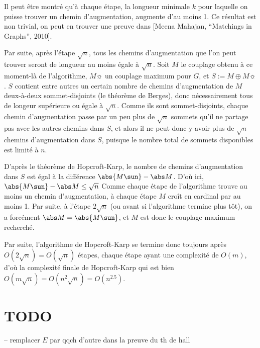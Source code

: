  Il peut être montré qu'à chaque étape, la longueur minimale $k$ pour laquelle on puisse trouver un chemin d'augmentation, augmente d'au moins 1. Ce résultat est non trivial, on peut en trouver une preuve dans [Meena Mahajan, ``Matchings in Graphs'', 2010].
 
 Par suite, après l'étape $\sqrt n$, tous les chemins d'augmentation que l'on peut trouver seront de longueur au moins égale à $\sqrt n$. Soit $M$ le couplage obtenu à ce moment-là de l'algorithme, $M\sun$ un couplage maximum pour $G$, et $S := M \oplus M\sun$. $S$ contient entre autres un certain nombre de chemins d'augmentation de $M$ deux-à-deux sommet-disjoints (\cf le théorème de Berges), donc nécessairement tous de longeur supérieure ou égale à $\sqrt n$. Comme ils sont sommet-disjoints, chaque chemin d'augmentation passe par un peu plus de $\sqrt n$ sommets qu'il ne partage pas avec les autres chemins dans $S$, et alors il ne peut donc y avoir plus de $\sqrt n$ chemins d'augmentation dans $S$, puisque le nombre total de sommets disponibles est limité à $n$.
 
 D'après le théorème de Hopcroft-Karp, le nombre de chemins d'augmentation dans $S$ est égal à la différence $\abs {M\sun} - \abs M$. D'où ici, $\abs {M\sun} - \abs M \leq \sqrt n$ Comme chaque étape de l'algorithme trouve au moins un chemin d'augmentation, à chaque étape $M$ croît en cardinal par au moins 1. Par suite, à l'étape $2 \sqrt n$ (ou avant si l'algorithme termine plus tôt), on a forcément $\abs M = \abs {M\sun}$, et $M$ est donc le couplage maximum recherché.
 
 Par suite, l'algorithme de Hopcroft-Karp se termine donc toujours après $O(2\sqrt n) = O(\sqrt n)$ étapes, chaque étape ayant une complexité de $O(m)$, d'où la complexité finale de Hopcroft-Karp qui est bien $O(m \sqrt n) = O(n^2 \sqrt n) = O(n^{2.5})$.
 
 \section{TODO}
 
 -- remplacer $E$ par qqch d'autre dans la preuve du th de hall
 

